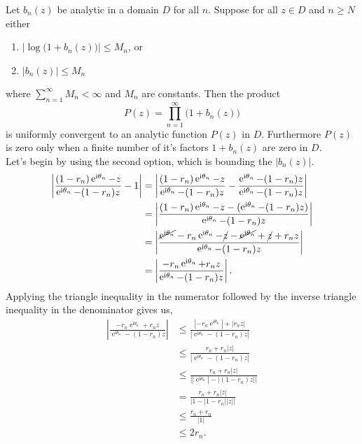 \documentclass[10pt]{amsart}
\newcommand{\I}{\mathrm{i}}
\DeclareMathOperator{\E}{e}
\theoremstyle{nonumberplain}
\begin{document}
\begin{enumerate}[label={\bf {\arabic*}:}]
\begin{itemize}
\noindent
Let $b_n(z)$ be analytic in a domain $D$ for all $n$.
Suppose for all $z \in D$ and $n \geq N$ either
\begin{enumerate}
\item $\big|\log \big(1 + b_n(z)\big)\big| \leq M_n$, or
\item $\big|b_n(z)\big| \leq M_n$
\end{enumerate}
where $\sum_{n = 1}^\infty M_n < \infty$ and $M_n$ are constants.
Then the product
$$P (z) = \prod_{n=1}^\infty \big(1 + b_n(z)\big)$$
is uniformly convergent to an analytic function $P(z)$ in $D$.
Furthermore $P(z)$ is zero only when a finite number of it's factors $1 + b_n(z)$ are zero in $D$. \\

\noindent
Let's begin by using the second option, which is bounding the $|b_n(z)|$.
\begin{align*}
\left|\frac{ (1 - r_n)\E^{\I \theta_n} - z}{ \E^{\I \theta_n} - (1 - r_n) z} - 1 \right| 
	&= \left|\frac{ (1 - r_n)\E^{\I \theta_n} - z}{ \E^{\I \theta_n} - (1 - r_n) z} - \frac{\E^{\I \theta_n} - (1 - r_n) z}{\E^{\I \theta_n} - (1 - r_n) z}\right| \\
	&= \left|\frac{ (1 - r_n)\E^{\I \theta_n} - z - (\E^{\I \theta_n} - (1 - r_n) z)}{ \E^{\I \theta_n} - (1 - r_n) z} \right| \\
	&= \left|\frac{ \cancel{\E^{\I \theta_n}} - r_n\E^{\I \theta_n} - \cancel{z} - \cancel{\E^{\I \theta_n}} + \cancel{z} + r_n z}{ \E^{\I \theta_n} - (1 - r_n) z} \right| \\
	&= \left|\frac{ - r_n\E^{\I \theta_n} + r_n z}{ \E^{\I \theta_n} - (1 - r_n) z} \right|.
\end{align*}
Applying the triangle inequality in the numerator followed by the inverse triangle inequality in the denominator gives us,
\begin{align*}
\left|\frac{ - r_n\E^{\I \theta_n} + r_n z}{ \E^{\I \theta_n} - (1 - r_n) z} \right|
	&\leq \frac{ |-r_n\E^{\I \theta_n}| + |r_n z|}{ \left|\E^{\I \theta_n} - (1 - r_n) z \right|} \\
	&\leq \frac{ r_n + r_n |z|}{ \left|\E^{\I \theta_n} - (1 - r_n) z \right|} \\
	&\leq \frac{ r_n + r_n |z|}{ \big| |\E^{\I \theta_n}| - |(1 - r_n) z| \big|} \\
	&= \frac{ r_n + r_n |z|}{ \big| 1 - |1 - r_n| |z| \big|} \\
	&\leq \frac{ r_n + r_n}{| 1 |} \\
	&\leq 2r_n.
\end{align*}

\end{itemize}
\end{enumerate}
\end{document}
